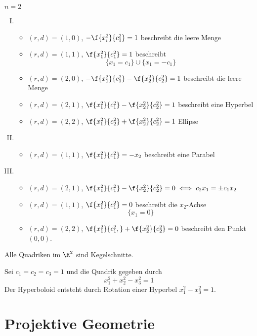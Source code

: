 \documentclass{mycourse}
\begin{document}
\begin{ex}[Quadriken in $E=\R^2$]
	$n=2$
	\begin{enumerate}[(I)]
		\item
			\begin{itemize}
				\item $(r,d)=(1,0)$, $-\f{x_i^2}{c_1^2}=1$ beschreibt die leere Menge

				\item $(r,d)=(1,1)$, $\f{x_1^2}{c_1^2}=1$ beschreibt
					\[
						\{x_1=c_1\} \cup \{x_1=-c_1\}
					\]
				\item $(r,d)=(2,0)$, $-\f{x_1^2}{c_1^2}-\f{x_2^2}{c_2^2}=1$ beschreibt die leere Menge

				\item $(r,d)=(2,1)$, $\f{x_1^2}{c_1^2}-\f{x_2^2}{c_2^2}=1$ beschreibt eine Hyperbel
				\item $(r,d)=(2,2)$, $\f{x_1^2}{c_2^2} + \f{x_2^2}{c_2^2}=1$ Ellipse
			\end{itemize}
		\item
			\begin{itemize}
				\item $(r,d)=(1,1)$, $\f{x_1^2}{c_1^2} = -x_2$ beschreibt eine Parabel
			\end{itemize}
		\item
			\begin{itemize}
				\item $(r,d)=(2,1)$, $\f{x_1^2}{c_1^2}-\f{x_2^2}{c_2^2} = 0 \iff c_2x_1 = \pm c_1x_2$
				\item $(r,d)=(1,1)$, $\f{x_1^2}{c_1^2} = 0$ beschreibt die $x_2$-Achse
					\[
						\{x_1 = 0\}
					\]
				\item $(r,d)=(2,2)$, $\f{x_1^2}{c_1^2,}+ \f{x_2^2}{c_2^2}=0$ beschreibt den Punkt $(0,0)$.
			\end{itemize}
	\end{enumerate}
	\begin{note}
		Alle Quadriken im $\R^2$ sind Kegelschnitte.
	\end{note}
\end{ex}

\begin{ex}[Hyperboloid]
	Sei $c_1=c_2=c_3=1$ und die Quadrik gegeben durch
	\[
		x_1^2 + x_2^2 - x_3^2 = 1
	\]
	Der Hyperboloid entsteht durch Rotation einer Hyperbel $x_1^2 - x_3^2 = 1$.
\end{ex}



\chapter{Projektive Geometrie}
\end{document}
